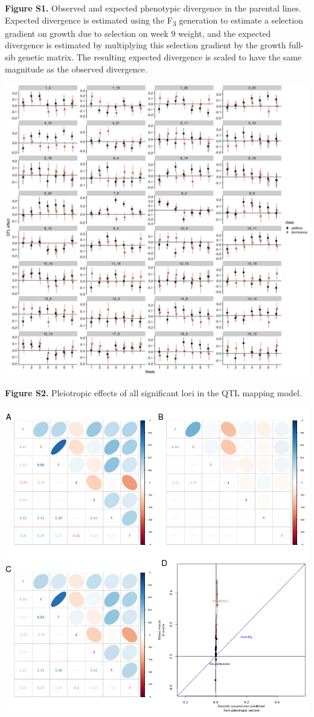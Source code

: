 \begin{refsection}
\textbf{Figure S1.} Observed and expected phenotypic divergence in the
parental lines. Expected divergence is estimated using the
F\textsubscript{3} generation to estimate a selection gradient on growth
due to selection on week 9 weight, and the expected divergence is
estimated by multiplying this selection gradient by the growth full-sib
genetic matrix. The resulting expected divergence is scaled to have the same
magnitude as the observed divergence.

\includegraphics[width=\linewidth]{chapter_JoH-Melo_etal/media/growth_per_marker_additive_dominance_vectors_QTL.png}

\textbf{Figure S2.} Pleiotropic effects of all significant loci in the QTL
mapping model.


\includegraphics[width=\linewidth]{chapter_JoH-Melo_etal/media/growth_cov_prediction_composite_GP.png}


\end{refsection}
